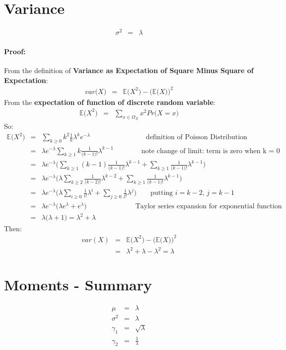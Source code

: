 \section{Variance}
\begin{eqnarray}
	\sigma^{2} &=& \lambda
\end{eqnarray}

\paragraph{Proof:}
From the definition of \textbf{\color{blue} Variance as Expectation of Square Minus Square of Expectation}:
\begin{eqnarray}
	var\big(X\big) &=& \mathbb{E}\big(X^{2}\big) - \Big(\mathbb{E}\big(X\big)\Big)^{2}
\end{eqnarray}
From the \textbf{\color{blue}expectation of function of discrete random variable}:
\begin{eqnarray}
	\mathbb{E}\big(X^{2}\big) &=& \sum_{x \in \Omega_{X}}x^{2}Pr\big(X = x\big)
\end{eqnarray}
So:
\begin{eqnarray}
	\nonumber
	\mathbb{E}\big(X^{2}\big) &=& \sum_{k \geq 0}k^{2}\frac{1}{k}\lambda^{k}e^{-\lambda} \qquad\qquad\qquad\qquad\text{definition of Poisson Distribution}\\
	\nonumber
	&=& \lambda e^{-\lambda}\sum_{k \geq 1}k\frac{1}{\big(k - 1\big)!}\lambda^{k - 1} \qquad\qquad\text{note change of limit: term is zero when k = 0}\\
	\nonumber
	&=& \lambda e^{-\lambda}\Bigg(\sum_{k \geq 1}(k - 1)\frac{1}{\big(k - 1\big)!}\lambda^{k - 1} + \sum_{k \geq 1}\frac{1}{\big(k - 1\big)!}\lambda^{k - 1}\Bigg)\\
	\nonumber
	&=& \lambda e^{-\lambda}\Bigg(\lambda\sum_{k \geq 2}\frac{1}{\big(k - 2\big)!}\lambda^{k - 2} + \sum_{k \geq 1}\frac{1}{\big(k - 1\big)!}\lambda^{k - 1}\Bigg)\\
	\nonumber
	&=& \lambda e^{-\lambda}\Bigg(\lambda\sum_{i \geq 0}\frac{1}{i!}\lambda^{i} + \sum_{j \geq 0}\frac{1}{j!}\lambda^{j}\Bigg) \quad\quad\text{putting } i = k - 2\text{, } j = k - 1\\
	\nonumber
	&=& \lambda e^{-\lambda}\bigg(\lambda e^{\lambda} + e^{\lambda}\bigg) \qquad\qquad\qquad\quad\text{Taylor series expansion for exponential function}\\
	&=& \lambda\big(\lambda + 1\big) = \lambda^{2} + \lambda
\end{eqnarray}
Then:
\begin{eqnarray}
	\nonumber
	var(X) &=& \mathbb{E}\bigg(X^{2}\bigg) - \bigg(\mathbb{E}\big(X\big)\bigg)^{2}\\
	&=& \lambda^{2} + \lambda - \lambda^{2} = \lambda
\end{eqnarray}

\section{Moments - Summary}
\begin{eqnarray}
	\mu &=& \lambda\\
	\sigma^{2} &=& \lambda\\
	\gamma_{1} &=& \sqrt{\lambda}\\
	\gamma_{2} &=& \frac{1}{\lambda}
\end{eqnarray}
